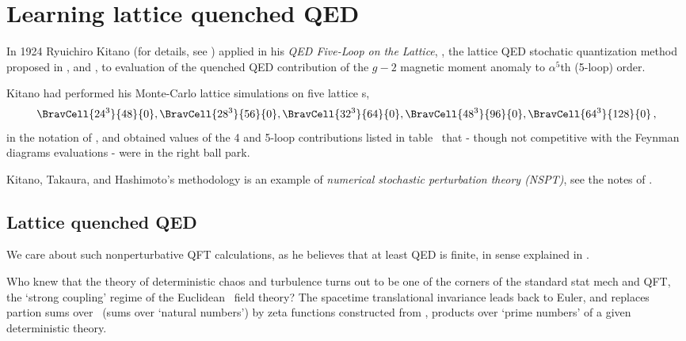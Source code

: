 
\chapter{Learning lattice quenched QED}
\label{c-stochastic}

In 1924 Ryuichiro Kitano (for details, see )
applied in his
{\em QED Five-Loop on the Lattice},
,
the lattice QED stochatic quantization method 
proposed in 
,  and  ,
to evaluation of the quenched QED contribution of the {$g-2$} magnetic moment anomaly
to $\alpha^5$th (5-loop) order.

Kitano had performed his Monte-Carlo lattice simulations on five lattice 
 {\pcell}s,
\[
\BravCell{24^3}{48}{0}, 
\BravCell{28^3}{56}{0}, 
\BravCell{32^3}{64}{0}, 
\BravCell{48^3}{96}{0},
\BravCell{64^3}{128}{0}
\,, 
\]
in the notation of ,
and obtained values of the 4 and 5-loop contributions listed in table~
that - though not competitive with the Feynman diagrams evaluations - were
in the right ball park.

Kitano, Takaura, and Hashimoto's  methodology is an example of
{\em numerical stochastic perturbation theory (NSPT)}, see the
notes of .

\section{Lattice quenched QED}
\label{sect:latticeQED}

We care about such nonperturbative QFT calculations, as he believes 
that at least QED is finite, in sense explained in .

Who knew that the theory of deterministic chaos and turbulence 
turns out to be one of the corners of the standard stat mech and QFT,
the `strong coupling' regime of the Euclidean \spt\ field theory?
The spacetime translational invariance leads back to Euler, 
and replaces partion sums over \lsts\ (sums over `natural numbers') by zeta functions constructed from
\primeOrbs, products over `prime numbers' of a given deterministic theory.

